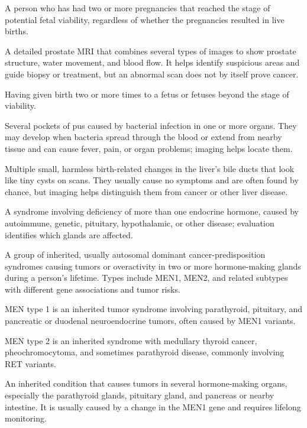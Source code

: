  A person who has had two or more pregnancies that reached the stage of potential fetal viability, regardless of whether the pregnancies resulted in live births.

 A detailed prostate MRI that combines several types of images to show prostate structure, water movement, and blood flow. It helps identify suspicious areas and guide biopsy or treatment, but an abnormal scan does not by itself prove cancer.

 Having given birth two or more times to a fetus or fetuses beyond the stage of viability.

 Several pockets of pus caused by bacterial infection in one or more organs. They may develop when bacteria spread through the blood or extend from nearby tissue and can cause fever, pain, or organ problems; imaging helps locate them.

 Multiple small, harmless birth-related changes in the liver's bile ducts that look like tiny cysts on scans. They usually cause no symptoms and are often found by chance, but imaging helps distinguish them from cancer or other liver disease.

 A syndrome involving deficiency of more than one endocrine hormone, caused by autoimmune, genetic, pituitary, hypothalamic, or other disease; evaluation identifies which glands are affected.

 A group of inherited, usually autosomal dominant cancer-predisposition syndromes causing tumors or overactivity in two or more hormone-making glands during a person's lifetime. Types include MEN1, MEN2, and related subtypes with different gene associations and tumor risks.

 MEN type 1 is an inherited tumor syndrome involving parathyroid, pituitary, and pancreatic or duodenal neuroendocrine tumors, often caused by MEN1 variants.

 MEN type 2 is an inherited syndrome with medullary thyroid cancer, pheochromocytoma, and sometimes parathyroid disease, commonly involving RET variants.

 An inherited condition that causes tumors in several hormone-making organs, especially the parathyroid glands, pituitary gland, and pancreas or nearby intestine. It is usually caused by a change in the MEN1 gene and requires lifelong monitoring.

